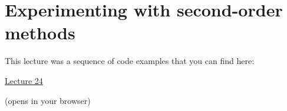 \section{Experimenting with second-order methods}

This lecture was a sequence of code examples that you can find here:

\begin{center}
{\Large
\href{https://ee227c.github.io/code/lecture24.html}{Lecture 24}
}

(opens in your browser)
\end{center}


